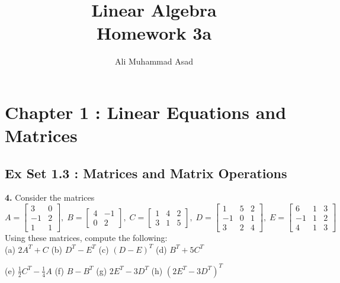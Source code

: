 \documentclass[addpoints]{exam}
\title{Linear Algebra\\ Homework 3a}
\author{Ali Muhammad Asad}
\begin{document}
\maketitle
\begin{sloppypar}
\section*{\textbf{Chapter 1 : Linear Equations and Matrices}}

\subsection*{\textbf{Ex Set 1.3 : Matrices and Matrix Operations}}

\begin{questions}
    \question
    \textbf{4. } Consider the matrices
    $$ A = \begin{bmatrix}
        3 & 0 \\ -1 & 2 \\ 1 & 1
    \end{bmatrix},\; B = \begin{bmatrix}
        4 & -1 \\ 0 & 2
    \end{bmatrix},\; C = \begin{bmatrix}
        1 & 4 & 2 \\ 3 & 1 & 5
    \end{bmatrix},\; D = \begin{bmatrix}
        1 & 5 & 2 \\ -1 &  0 & 1 \\ 3 & 2 & 4
    \end{bmatrix},\; E = \begin{bmatrix}
        6 & 1 & 3 \\ -1 & 1 & 2 \\ 4 & 1 & 3
    \end{bmatrix} $$
    Using these matrices, compute the following: \\ 
    (a) $ 2A^T + C $ \hspace{10mm} (b) $ D^T - E^T $ \hspace{10mm} (c) $ (D - E)^T $ \hspace{10mm} (d) $ B^T + 5C^T $
    
    \vspace{2mm} (e) $ \frac{1}{2}C^T - \frac{1}{4}A $ \hspace{7.5mm} (f) $ B - B^T $ \hspace{13mm} (g) $ 2E^T - 3D^T $  \hspace{7mm} (h) $ (2E^T - 3D^T)^T $
    \begin{solution}


\end{solution}
\end{questions}
\end{sloppypar}
\end{document}
